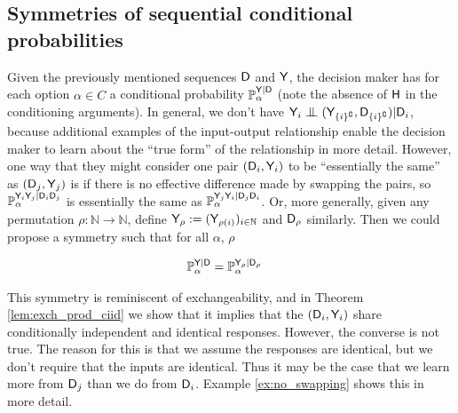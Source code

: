 \subsection[Conditional probability symmetries]{Symmetries of sequential conditional probabilities}\label{sec:ccontracibility}

Given the previously mentioned sequences $\mathsf{D}$ and $\mathsf{Y}$, the decision maker has for each option $\alpha\in C$ a conditional probability $\mathbb{P}_\alpha^{\mathsf{Y}|\mathsf{D}}$ (note the absence of $\mathsf{H}$ in the conditioning arguments). In general, we don't have $\RV{Y}_i\CI (\RV{Y}_{\{i\}^\complement},\RV{D}_{\{i\}^\complement}) | \RV{D}_i$, because additional examples of the input-output relationship enable the decision maker to learn about the ``true form'' of the relationship in more detail. However, one way that they might consider one pair $(\mathsf{D}_i,\mathsf{Y}_i)$ to be ``essentially the same'' as $(\mathsf{D}_j, \mathsf{Y}_j)$ is if there is no effective difference made by swapping the pairs, so $\mathbb{P}_\alpha^{\mathsf{Y}_i\mathsf{Y}_j|\mathsf{D}_i\mathsf{D}_j}$ is essentially the same as $\mathbb{P}_\alpha^{\mathsf{Y}_j\mathsf{Y}_i|\mathsf{D}_j\mathsf{D}_i}$. Or, more generally, given any permutation $\rho:\mathbb{N}\to \mathbb{N}$, define $\mathsf{Y}_\rho:=(\mathsf{Y}_{\rho(i)})_{i\in\mathbb{N}}$ and $\mathsf{D}_{\rho}$ similarly. Then we could propose a symmetry such that for all $\alpha$, $\rho$

\begin{align}
    \mathbb{P}_\alpha^{\mathsf{Y}|\mathsf{D}} &= \mathbb{P}_\alpha^{\mathsf{Y}_\rho|\mathsf{D}_\rho}
\end{align}

This symmetry is reminiscent of exchangeability, and in Theorem \ref{lem:exch_prod_ciid} we show that it implies that the $(\mathsf{D}_i,\mathsf{Y}_i)$ share conditionally independent and identical responses. However, the converse is not true. The reason for this is that we assume the responses are identical, but we don't require that the inputs are identical. Thus it may be the case that we learn more from $\mathsf{D}_j$ than we do from $\mathsf{D}_i$. Example \ref{ex:no_swapping} shows this in more detail.

